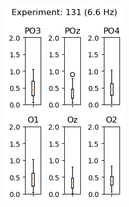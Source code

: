 \begin{figure}[ht]
    \begin{subfigure}{0.25\linewidth}
        \includegraphics[width=\linewidth]{images/appendix/13166.png}
        \label{fig:13166}
    \end{subfigure}
    \begin{subfigure}{0.25\linewidth}

\end{subfigure}
\end{figure}
